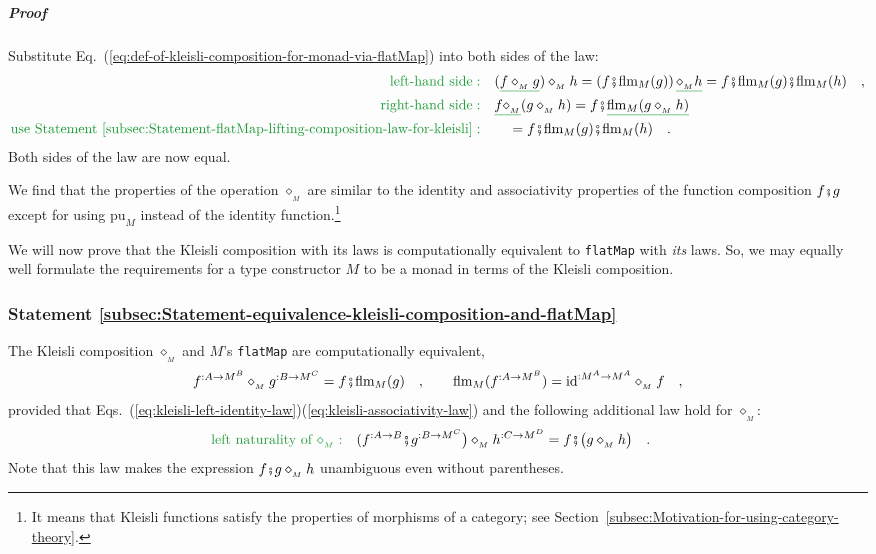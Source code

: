 \subparagraph{Proof}

Substitute Eq.~(\ref{eq:def-of-kleisli-composition-for-monad-via-flatMap})
into both sides of the law:
\begin{align*}
{\color{greenunder}\text{left-hand side}:}\quad & (\gunderline{f\diamond_{_{M}}g})\diamond_{_{M}}h=\left(f\bef\text{flm}_{M}(g)\right)\gunderline{\diamond_{_{M}}h}=f\bef\text{flm}_{M}(g)\bef\text{flm}_{M}(h)\quad,\\
{\color{greenunder}\text{right-hand side}:}\quad & \gunderline{f\diamond_{_{M}}}(g\diamond_{_{M}}h)=f\bef\gunderline{\text{flm}_{M}(g\diamond_{_{M}}h)}\\
{\color{greenunder}\text{use Statement~\ref{subsec:Statement-flatMap-lifting-composition-law-for-kleisli}}:}\quad & \quad=f\bef\text{flm}_{M}(g)\bef\text{flm}_{M}(h)\quad.
\end{align*}
Both sides of the law are now equal.

We find that the properties of the operation $\diamond_{_{M}}$ are
similar to the identity and associativity properties of the function
composition $f\bef g$ except for using $\text{pu}_{M}$ instead of
the identity function.\footnote{It means that Kleisli functions satisfy the properties of morphisms
of a category; see Section~\ref{subsec:Motivation-for-using-category-theory}.}

We will now prove that the Kleisli composition with its laws is computationally
equivalent to \lstinline!flatMap! with \emph{its} laws. So, we may
equally well formulate the requirements for a type constructor $M$
to be a monad in terms of the Kleisli composition.

\subsubsection{Statement \label{subsec:Statement-equivalence-kleisli-composition-and-flatMap}\ref{subsec:Statement-equivalence-kleisli-composition-and-flatMap}}

The Kleisli composition $\diamond_{_{M}}$ and $M$\textsf{'}s \lstinline!flatMap!
are computationally equivalent,
\begin{equation}
f^{:A\rightarrow M^{B}}\diamond_{_{M}}g^{:B\rightarrow M^{C}}=f\bef\text{flm}_{M}(g)\quad,\quad\quad\text{flm}_{M}(f^{:A\rightarrow M^{B}})=\text{id}^{:M^{A}\rightarrow M^{A}}\diamond_{_{M}}f\quad,\label{eq:express-kleisli-composition-via-flatMap-and-back}
\end{equation}
provided that Eqs.~(\ref{eq:kleisli-left-identity-law})\textendash (\ref{eq:kleisli-associativity-law})
and the following additional law hold for $\diamond_{_{M}}$:
\begin{align}
{\color{greenunder}\text{left naturality of }\diamond_{_{M}}:}\quad & (f^{:A\rightarrow B}\bef g^{:B\rightarrow M^{C}}\big)\diamond_{_{M}}h^{:C\rightarrow M^{D}}=f\bef\big(g\diamond_{_{M}}h\big)\quad.\label{eq:left-naturality-of-kleisli-composition}
\end{align}
Note that this law makes the expression $f\bef g\diamond_{_{M}}h$
unambiguous even without parentheses.

